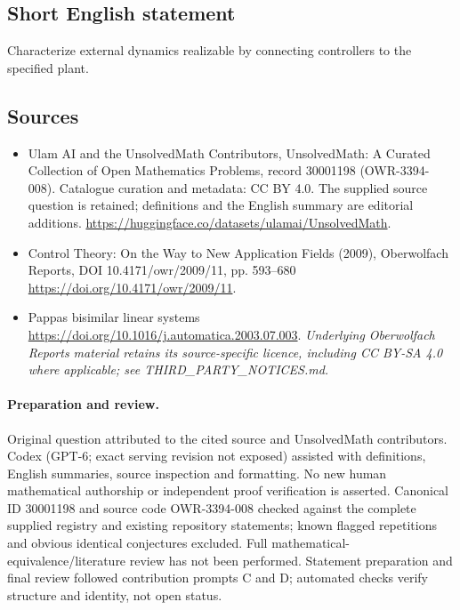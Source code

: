 \documentclass[11pt]{article}
\begin{document}
\subsection{Short English statement}
Characterize external dynamics realizable by connecting controllers to the specified plant.
\subsection{Sources}
\begin{itemize}
\item[\hypertarget{source:30001198:1}{S1}] Ulam AI and the UnsolvedMath Contributors, UnsolvedMath: A Curated Collection of Open Mathematics Problems, record 30001198 (OWR-3394-008). Catalogue curation and metadata: CC BY 4.0. The supplied source question is retained; definitions and the English summary are editorial additions.
\url{https://huggingface.co/datasets/ulamai/UnsolvedMath}.
\item[\hypertarget{source:30001198:2}{S2}] Control Theory: On the Way to New Application Fields (2009), Oberwolfach Reports, DOI 10.4171/owr/2009/11, pp. 593--680
\url{https://doi.org/10.4171/owr/2009/11}.
\item[\hypertarget{source:30001198:3}{S3}] Pappas bisimilar linear systems
\url{https://doi.org/10.1016/j.automatica.2003.07.003}.
\textit{Underlying Oberwolfach Reports material retains its source-specific licence, including CC BY-SA 4.0 where applicable; see THIRD\_PARTY\_NOTICES.md.}
\end{itemize}
\paragraph{Preparation and review.}
Original question attributed to the cited source and UnsolvedMath contributors. Codex (GPT-6; exact serving revision not exposed) assisted with definitions, English summaries, source inspection and formatting. No new human mathematical authorship or independent proof verification is asserted. Canonical ID 30001198 and source code OWR-3394-008 checked against the complete supplied registry and existing repository statements; known flagged repetitions and obvious identical conjectures excluded. Full mathematical-equivalence/literature review has not been performed. Statement preparation and final review followed contribution prompts C and D; automated checks verify structure and identity, not open status.
\label{end:30001198}
\end{document}
